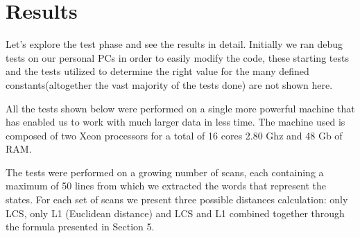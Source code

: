 \section{Results}

Let's explore the test phase and see the results in detail. Initially we ran debug tests on our personal PCs in order to easily modify the code, these starting tests and the tests utilized to determine the right value for the many defined constants(altogether the vast majority of the tests done) are not shown here. 

All the tests shown below were performed on a single more powerful machine that has enabled us to work with much larger data in less time. The machine used is composed of two Xeon processors for a total of 16 cores 2.80 Ghz and 48 Gb of RAM.

The tests were performed on a growing number of scans, each containing a maximum of 50 lines from which we extracted the words that represent the states. For each set of scans we present three possible distances calculation: only LCS, only L1 (Euclidean distance) and LCS and L1 combined together through the formula presented in Section 5.

\vspace{3mm}

